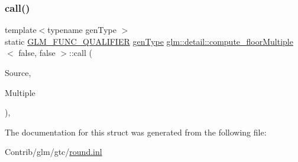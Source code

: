 \subsubsection{\texorpdfstring{call()}{call()}}
{\footnotesize\ttfamily template$<$typename gen\+Type $>$ \\
static \mbox{\hyperlink{setup_8hpp_a33fdea6f91c5f834105f7415e2a64407}{G\+L\+M\+\_\+\+F\+U\+N\+C\+\_\+\+Q\+U\+A\+L\+I\+F\+I\+ER}} \mbox{\hyperlink{structglm_1_1detail_1_1gen_type}{gen\+Type}} \mbox{\hyperlink{structglm_1_1detail_1_1compute__floor_multiple}{glm\+::detail\+::compute\+\_\+floor\+Multiple}}$<$ false, false $>$\+::call (\begin{DoxyParamCaption}\item[{\mbox{\hyperlink{structglm_1_1detail_1_1gen_type}{gen\+Type}}}]{Source,  }\item[{\mbox{\hyperlink{structglm_1_1detail_1_1gen_type}{gen\+Type}}}]{Multiple }\end{DoxyParamCaption})\hspace{0.3cm}{\ttfamily [inline]}, {\ttfamily [static]}}



The documentation for this struct was generated from the following file\+:\begin{DoxyCompactItemize}
\item 
Contrib/glm/gtc/\mbox{\hyperlink{round_8inl}{round.\+inl}}\end{DoxyCompactItemize}
